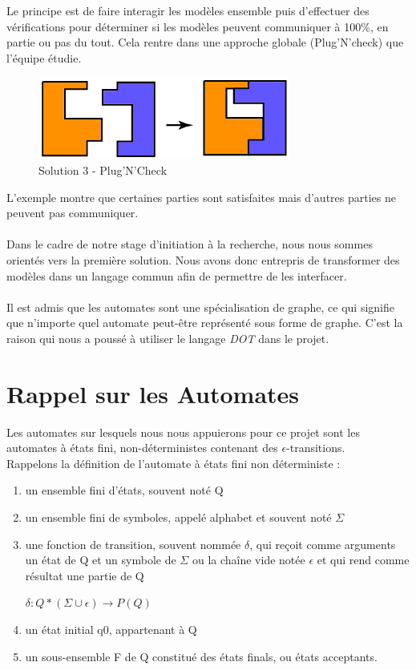 \documentclass[12pt,a4paper]{report}
\begin{document}
Le principe est de faire interagir les modèles ensemble puis d'effectuer des 
vérifications pour déterminer si les modèles peuvent communiquer à 100\%, 
en partie ou pas du tout. Cela rentre dans une approche globale (Plug'N'check) 
que l'équipe étudie.

\begin{figure}[h]
	\centering
	\includegraphics[scale=1]{ressources/solution3.png}
	\caption{Solution 3 - Plug'N'Check}
\end{figure}

L'exemple montre que certaines parties sont satisfaites mais d'autres parties ne 
peuvent pas communiquer.
\\\\
Dans le cadre de notre stage d'initiation à la recherche, nous nous sommes 
orientés vers la première solution. Nous avons donc entrepris de transformer 
des modèles dans un langage commun afin de permettre de les 
interfacer.
\\\\
Il est admis que les automates sont une spécialisation de graphe, ce qui 
signifie que n'importe quel automate peut-être représenté sous forme de graphe. 
C'est la raison qui nous a poussé à utiliser le langage \emph{DOT} dans le projet.

\newpage
\section{Rappel sur les Automates}

    Les automates sur lesquels nous nous appuierons pour ce projet sont les automates à états fini, 
    non-déterministes contenant des $\epsilon$-transitions.\\
    
    Rappelons la définition de l’automate à états fini non déterministe :
\begin{enumerate}
    \item un ensemble fini d’états, souvent noté Q 
    \item un ensemble fini de symboles, appelé alphabet et souvent noté $\Sigma$ 
    \item une fonction de transition, souvent nommée $\delta$, qui reçoit comme arguments un état de Q et un symbole de $\Sigma$ ou la chaîne vide notée $\epsilon$ et qui rend comme résultat une partie de Q \begin{center}$\delta : Q * ( \Sigma \cup \epsilon ) \rightarrow P(Q)$ \end{center}
    \item un état initial q0, appartenant à Q
    \item un sous-ensemble F de Q constitué des états finals, ou états acceptants.\\
\end{enumerate}    
\end{document}
